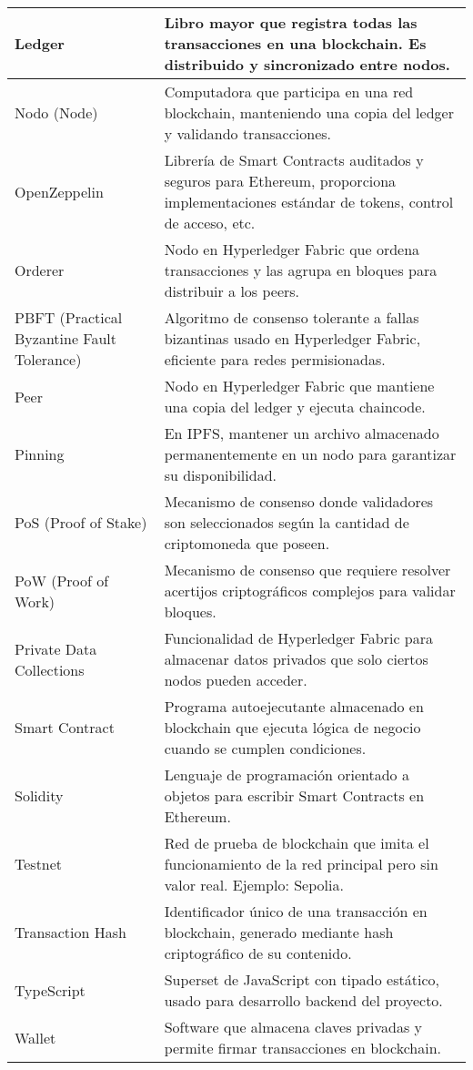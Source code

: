 \begin{longtable}{|p{3.5cm}|p{10.5cm}|}
Ledger & Libro mayor que registra todas las transacciones en una blockchain. Es distribuido y sincronizado entre nodos. \\ \hline
Nodo (Node) & Computadora que participa en una red blockchain, manteniendo una copia del ledger y validando transacciones. \\ \hline
OpenZeppelin & Librería de Smart Contracts auditados y seguros para Ethereum, proporciona implementaciones estándar de tokens, control de acceso, etc. \\ \hline
Orderer & Nodo en Hyperledger Fabric que ordena transacciones y las agrupa en bloques para distribuir a los peers. \\ \hline
PBFT (Practical Byzantine Fault Tolerance) & Algoritmo de consenso tolerante a fallas bizantinas usado en Hyperledger Fabric, eficiente para redes permisionadas. \\ \hline
Peer & Nodo en Hyperledger Fabric que mantiene una copia del ledger y ejecuta chaincode. \\ \hline
Pinning & En IPFS, mantener un archivo almacenado permanentemente en un nodo para garantizar su disponibilidad. \\ \hline
PoS (Proof of Stake) & Mecanismo de consenso donde validadores son seleccionados según la cantidad de criptomoneda que poseen. \\ \hline
PoW (Proof of Work) & Mecanismo de consenso que requiere resolver acertijos criptográficos complejos para validar bloques. \\ \hline
Private Data Collections & Funcionalidad de Hyperledger Fabric para almacenar datos privados que solo ciertos nodos pueden acceder. \\ \hline
Smart Contract & Programa autoejecutante almacenado en blockchain que ejecuta lógica de negocio cuando se cumplen condiciones. \\ \hline
Solidity & Lenguaje de programación orientado a objetos para escribir Smart Contracts en Ethereum. \\ \hline
Testnet & Red de prueba de blockchain que imita el funcionamiento de la red principal pero sin valor real. Ejemplo: Sepolia. \\ \hline
Transaction Hash & Identificador único de una transacción en blockchain, generado mediante hash criptográfico de su contenido. \\ \hline
TypeScript & Superset de JavaScript con tipado estático, usado para desarrollo backend del proyecto. \\ \hline
Wallet & Software que almacena claves privadas y permite firmar transacciones en blockchain. \\ \hline
\end{longtable}
